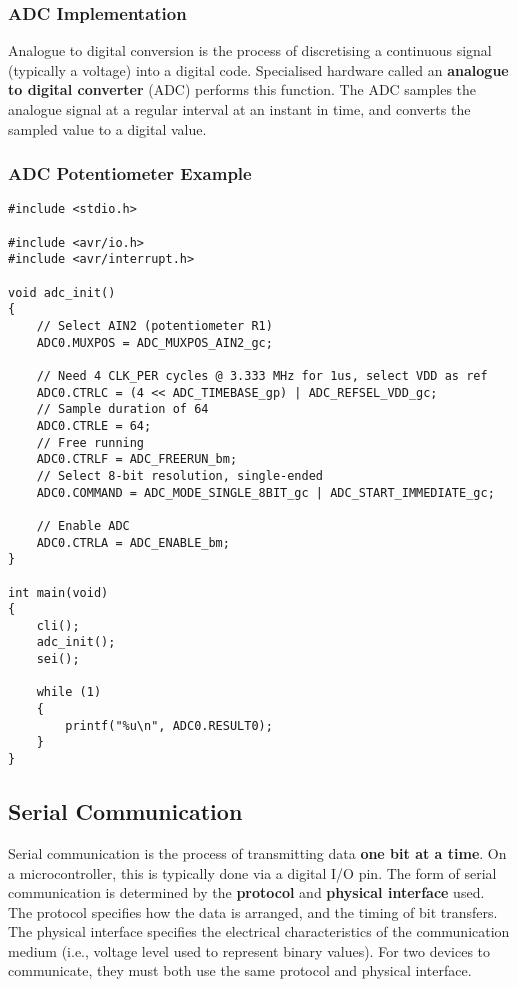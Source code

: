 \documentclass{article}
\begin{document}
\subsubsection{ADC Implementation}
Analogue to digital conversion is the process of discretising a
continuous signal (typically a voltage) into a digital code.
Specialised hardware called an \textbf{analogue to digital converter}
(ADC) performs this function. The ADC samples the analogue signal at a
regular interval at an instant in time, and converts the sampled value
to a digital value.
\subsubsection{ADC Potentiometer Example}
\begin{verbatim}
#include <stdio.h>

#include <avr/io.h>
#include <avr/interrupt.h>

void adc_init()
{
    // Select AIN2 (potentiometer R1)
    ADC0.MUXPOS = ADC_MUXPOS_AIN2_gc;

    // Need 4 CLK_PER cycles @ 3.333 MHz for 1us, select VDD as ref
    ADC0.CTRLC = (4 << ADC_TIMEBASE_gp) | ADC_REFSEL_VDD_gc;
    // Sample duration of 64
    ADC0.CTRLE = 64;
    // Free running
    ADC0.CTRLF = ADC_FREERUN_bm;
    // Select 8-bit resolution, single-ended
    ADC0.COMMAND = ADC_MODE_SINGLE_8BIT_gc | ADC_START_IMMEDIATE_gc;

    // Enable ADC
    ADC0.CTRLA = ADC_ENABLE_bm;
}

int main(void)
{
    cli();
    adc_init();
    sei();

    while (1)
    {
        printf("%u\n", ADC0.RESULT0);
    }
}
\end{verbatim}
\subsection{Serial Communication}
Serial communication is the process of transmitting data \textbf{one
bit at a time}. On a microcontroller, this is typically done via a
digital I/O pin. The form of serial communication is determined by the
\textbf{protocol} and \textbf{physical interface} used. The protocol
specifies how the data is arranged, and the timing of bit transfers.
The physical interface specifies the electrical characteristics of the
communication medium (i.e., voltage level used to represent binary
values). For two devices to communicate, they must both use the same
protocol and physical interface.
\end{document}
